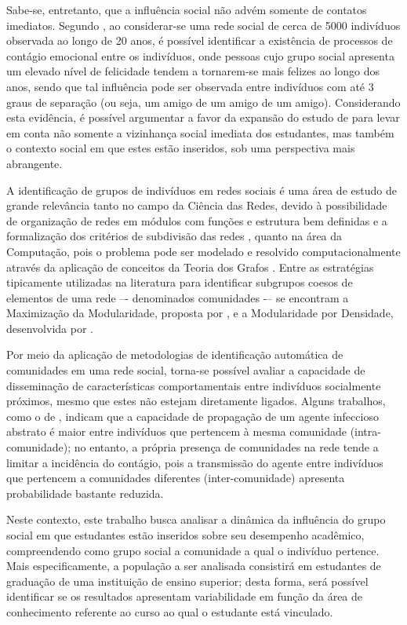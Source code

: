 Sabe-se, entretanto, que a influência social não advém somente de contatos imediatos. Segundo , ao considerar-se uma rede social de cerca de 5000 indivíduos observada ao longo de 20 anos, é possível identificar a existência de processos de contágio emocional entre os indivíduos, onde pessoas cujo grupo social apresenta um elevado nível de felicidade tendem a tornarem-se mais felizes ao longo dos anos, sendo que tal influência pode ser observada entre indivíduos com até 3 graus de separação (ou seja, um amigo de um amigo de um amigo). Considerando esta evidência, é possível argumentar a favor da expansão do estudo de  para levar em conta não somente a vizinhança social imediata dos estudantes, mas também o contexto social em que estes estão inseridos, sob uma perspectiva mais abrangente.

A identificação de grupos de indivíduos em redes sociais é uma área de estudo de grande relevância tanto no campo da Ciência das Redes, devido à possibilidade de organização de redes em módulos com funções e estrutura bem definidas e a formalização dos critérios de subdivisão das redes \cite{Wasserman1994,Newman2003}, quanto na área da Computação, pois o problema pode ser modelado e resolvido computacionalmente através da aplicação de conceitos da Teoria dos Grafos \cite{Easley2010}. Entre as estratégias tipicamente utilizadas na literatura para identificar subgrupos coesos de elementos de uma rede –- denominados comunidades -– se encontram a Maximização da Modularidade, proposta por , e a Modularidade por Densidade, desenvolvida por .

Por meio da aplicação de metodologias de identificação automática de comunidades em uma rede social, torna-se possível avaliar a capacidade de disseminação de características comportamentais entre indivíduos socialmente próximos, mesmo que estes não estejam diretamente ligados. Alguns trabalhos, como o de , indicam que a capacidade de propagação de um agente infeccioso abstrato é maior entre indivíduos que pertencem à mesma comunidade (intra-comunidade); no entanto, a própria presença de comunidades na rede tende a limitar a incidência do contágio, pois a transmissão do agente entre indivíduos que pertencem a comunidades diferentes (inter-comunidade) apresenta probabilidade bastante reduzida.

Neste contexto, este trabalho busca analisar a dinâmica da influência do grupo social em que estudantes estão inseridos sobre seu desempenho acadêmico, compreendendo como grupo social a comunidade a qual o indivíduo pertence. Mais especificamente, a população a ser analisada consistirá em estudantes de graduação de uma instituição de ensino superior; desta forma, será possível identificar se os resultados apresentam variabilidade em função da área de conhecimento referente ao curso ao qual o estudante está vinculado.

